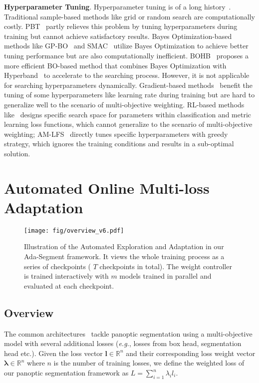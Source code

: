 \documentclass[letterpaper]{article} \usepackage{aaai21}  \usepackage{times}  \usepackage{helvet} \usepackage{courier}  \usepackage[hyphens]{url}  \usepackage{graphicx} \urlstyle{rm} \def\UrlFont{\rm}  \usepackage{natbib}  \usepackage{caption} \frenchspacing  \setlength{\pdfpagewidth}{8.5in}  \setlength{\pdfpageheight}{11in}
\begin{document}
 \noindent
 \textbf{Hyperparameter Tuning}. Hyperparameter tuning is of a long history~\cite{feurer2019HPOsuvey}. 
 Traditional sample-based methods like grid or random search are computationally costly. 
 PBT~\cite{jaderberg2017pbt} partly relieves this problem by tuning hyperparameters during training 
 but cannot achieve satisfactory results. 
 Bayes Optimization-based methods like GP-BO~\cite{snoek2012GPBO} and SMAC~\cite{hutter2011SMAC} 
 utilize Bayes Optimization to achieve better tuning performance but 
 are also computationally inefficient.
 BOHB~\cite{falkner2018bohb} proposes a more efficient BO-based method that combines Bayes Optimization
 with Hyperband~\cite{li2017hyperband} to accelerate to the searching process. 
 However, it is not applicable for searching hyperparameters dynamically. 
 Gradient-based methods~\cite{zeiler2012adadelta,baydin2017HDsgd,pedregosa2016AGhpo} benefit the tuning of some hyperparameters 
 like learning rate during training but are hard to generalize well to the scenario 
 of multi-objective weighting. 
RL-based methods like~\cite{huang2019addressing} designs specific search space for parameters within
 classification and metric learning loss functions, which cannot generalize to the scenario of 
 multi-objective weighting; AM-LFS~\cite{li2019AMlfs} directly tunes specific hyperparameters with greedy strategy, 
 which ignores the training conditions and results in a sub-optimal solution.

 \section{Automated Online Multi-loss Adaptation}
 \label{rec:Dm-ada}


 \begin{figure}[t]
   \centering
   \texttt{[image: fig/overview\_v6.pdf]}
\caption{
   Illustration of the Automated Exploration and Adaptation in our Ada-Segment framework. 
   It views the whole training process as a series of checkpoints ( $T$ checkpoints in total).
   The weight controller is trained interactively with 
   $m$ models trained in parallel and evaluated at each checkpoint. }
   \label{Overview}
\end{figure}

 \subsection{Overview}
 The common architectures~\cite{panopticFPNkirillov2019,upsnetxiong2019} tackle panoptic segmentation using 
 a multi-objective model with several additional losses 
 (\textit{e.g.}, losses from box head, segmentation head etc.).
 Given the loss vector $\boldsymbol{l} \in \mathbb{R}^n$ and their corresponding loss weight vector 
 $\boldsymbol{\lambda} \in \mathbb{R}^n$ where $n$ is the number of training losses,
 we define the weighted loss of our panoptic segmentation framework as $L=\sum_{i=1}^n\lambda_{i}l_{i}$.
\end{document}

